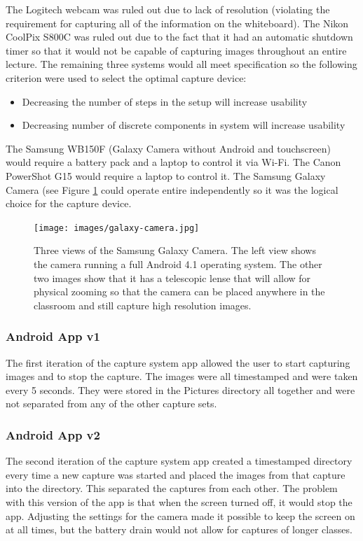 \documentclass[]{article}
\begin{document}
				\noindent
				The Logitech webcam was ruled out due to lack of resolution (violating the requirement for capturing all of the information on the whiteboard). The Nikon CoolPix S800C was ruled out due to the fact that it had an automatic shutdown timer so that it would not be capable of capturing images throughout an entire lecture. The remaining three systems would all meet specification so the following criterion were used to select the optimal capture device:
				\begin{itemize}
					\item Decreasing the number of steps in the setup will increase usability
					\item Decreasing number of discrete components in system will increase usability
				\end{itemize}
				The Samsung WB150F (Galaxy Camera without Android and touchscreen) would require a battery pack and a laptop to control it via Wi-Fi. The Canon PowerShot G15 would require a laptop to control it. The Samsung Galaxy Camera (see Figure \ref{img:galaxy-camera} could operate entire independently so it was the logical choice for the capture device. 
				
				\begin{figure}[h]
					\centering
					\texttt{[image: images/galaxy-camera.jpg]}
					\caption{Three views of the Samsung Galaxy Camera. The left view shows the camera running a full Android 4.1 operating system. The other two images show that it has a telescopic lense that will allow for physical zooming so that the camera can be placed anywhere in the classroom and still capture high resolution images.}		
					\label{img:galaxy-camera}
				\end{figure}
			
			\subsubsection{Android App v1}
				The first iteration of the capture system app allowed the user to start capturing images and to stop the capture. The images were all timestamped and were taken every 5 seconds. They were stored in the Pictures directory all together and were not separated from any of the other capture sets.
				
			\subsubsection{Android App v2}
				The second iteration of the capture system app created a timestamped directory every time a new capture was started and placed the images from that capture into the directory. This separated the captures from each other. The problem with this version of the app is that when the screen turned off, it would stop the app. Adjusting the settings for the camera made it possible to keep the screen on at all times, but the battery drain would not allow for captures of longer classes.
				
\end{document}
